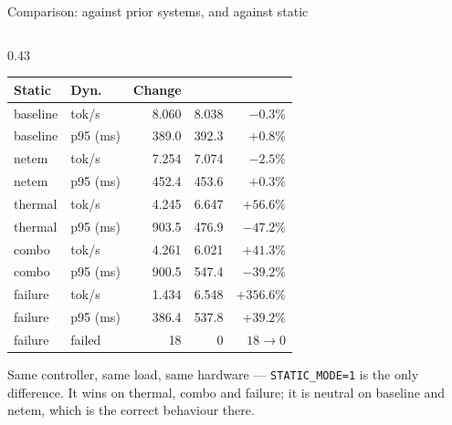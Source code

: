 \documentclass[aspectratio=169,9pt]{beamer}
\newcommand{\good}[1]{{\color{keGreen}#1}}
\newcommand{\bad}[1]{{\color{keRed}#1}}
\begin{document}
\begin{frame}[shrink=25]{Comparison: against prior systems, and against static}
\begin{columns}[T]
\begin{column}{0.43\textwidth}
\begin{tabular}{@{}llrrr@{}}
        \color{keNavy}\bfseries Static & \color{keNavy}\bfseries Dyn. &
        \color{keNavy}\bfseries Change \\
        \midrule
        baseline & tok/s    & 8.060 & 8.038 & $-0.3\%$ \\
        baseline & p95 (ms) & 389.0 & 392.3 & $+0.8\%$ \\
        netem    & tok/s    & 7.254 & 7.074 & \bad{$-2.5\%$} \\
        netem    & p95 (ms) & 452.4 & 453.6 & $+0.3\%$ \\
        thermal  & tok/s    & 4.245 & 6.647 & \good{$+56.6\%$} \\
        thermal  & p95 (ms) & 903.5 & 476.9 & \good{$-47.2\%$} \\
        combo    & tok/s    & 4.261 & 6.021 & \good{$+41.3\%$} \\
        combo    & p95 (ms) & 900.5 & 547.4 & \good{$-39.2\%$} \\
        failure  & tok/s    & 1.434 & 6.548 & \good{$+356.6\%$} \\
        failure  & p95 (ms) & 386.4 & 537.8 & \bad{$+39.2\%$} \\
        failure  & failed   & 18    & 0     & \good{$18 \to 0$} \\
        \bottomrule
      \end{tabular}
      \vspace{0.5em}

      {\color{keMuted} Same controller, same load, same hardware ---
      \texttt{STATIC\_MODE=1} is the only difference. It wins on thermal, combo
      and failure; it is neutral on baseline and netem, which is the correct
      behaviour there.}
    \end{column}
  \end{columns}
\end{frame}
\end{document}

